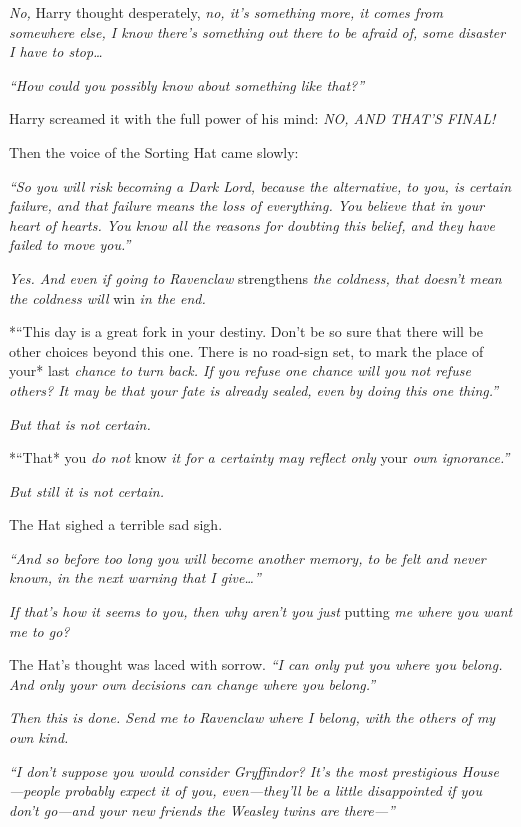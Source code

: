 \emph{No,} Harry thought desperately, \emph{no, it's something more, it
comes from somewhere else, I know there's something out there to be
afraid of, some disaster I have to stop\ldots{}}

\emph{``How could you possibly know about something like that?''}

Harry screamed it with the full power of his mind: \emph{NO, AND THAT'S
FINAL!}

Then the voice of the Sorting Hat came slowly:

\emph{``So you will risk becoming a Dark Lord, because the alternative,
to you, is certain failure, and that failure means the loss of
everything. You believe that in your heart of hearts. You know all the
reasons for doubting this belief, and they have failed to move you.''}

\emph{Yes. And even if going to Ravenclaw} strengthens \emph{the
coldness, that doesn't mean the coldness will} win \emph{in the end.}

*``This day is a great fork in your destiny. Don't be so sure that there
will be other choices beyond this one. There is no road-sign set, to
mark the place of your* last \emph{chance to turn back. If you refuse
one chance will you not refuse others? It may be that your fate is
already sealed, even by doing this one thing.''}

\emph{But that is not certain.}

*``That* you \emph{do not} know \emph{it for a certainty may reflect
only} your \emph{own ignorance.''}

\emph{But still it is not certain.}

The Hat sighed a terrible sad sigh.

\emph{``And so before too long you will become another memory, to be
felt and never known, in the next warning that I give\ldots{}''}

\emph{If that's how it seems to you, then why aren't you just} putting
\emph{me where you want me to go?}

The Hat's thought was laced with sorrow. \emph{``I can only put you
where you belong. And only your own decisions can change where you
belong.''}

\emph{Then this is done. Send me to Ravenclaw where I belong, with the
others of my own kind.}

\emph{``I don't suppose you would consider Gryffindor? It's the most
prestigious House---people probably expect it of you, even---they'll be
a little disappointed if you don't go---and your new friends the Weasley
twins are there---''}

